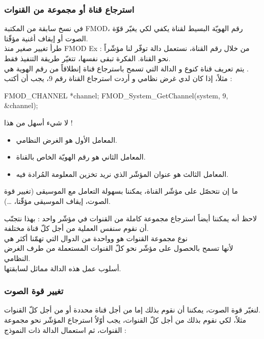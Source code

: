 \subsubsection{استرجاع قناة أو مجموعة من القنوات}

في نسخ سابقة من المكتبة
\textenglish{FMOD}،
رقم الهويّة البسيط لقناة يكفي لكي يغيّر قوّة الصوت أو إيقاف أغنية مؤقّتا.\\
طرأ تغيير صغير منذ
\textenglish{FMOD Ex} :
من خلال رقم القناة، نستعمل دالة توفّر لنا مؤشّراً نحو القناة. الفكرة تبقى نفسها، تتغيّر طريقة التنفيذ فقط.\\
يتم تعريف قناة كنوع
و الدالة التي تسمح باسترجاع قناة إنطلاقاً من رقم الهوية هي
.\\
مثلاً، إذا كان لدي غرض نظامي و أردت استرجاع القناة رقم 9، يجب أن أكتب :

\begin{Csource}
FMOD_CHANNEL *channel;
FMOD_System_GetChannel(system, 9, &channel);
\end{Csource}

لا شيء أسهل من هذا !

\begin{itemize}
	\item المعامل الأول هو الغرض النظامي.
	\item المعامل الثاني هو رقم الهويّة الخاص بالقناة.
	\item المعامل الثالث هو عنوان المؤشّر الذي نريد تخزين المعلومة المُرادة فيه.
\end{itemize}

ما إن نتحصّل على مؤشّر القناة، يمكننا بسهولة التعامل مع الموسيقى (تغيير قوة الصوت، إيقاف الموسيقى مؤقّتا، \dots).

لاحظ أنه يمكننا أيضاً استرجاع مجموعة كاملة من القنوات في مؤشّر واحد : بهذا نتجنّب أن نقوم سنفس العملية من أجل كلّ قناة مختلفة.\\
نوع مجموعة القنوات هو
وواحدة من الدوال التي تهمّنا أكثر هي\\
لأنها تسمح بالحصول على مؤشّر نحو كلّ القنوات المستعملة من طرف الغرض النظامي.\\
أسلوب عمل هذه الدالة مماثل لسابقتها.

\subsubsection{تغيير قوة الصوت}

لنغيّر قوة الصوت، يمكننا أن نقوم بذلك إما من أجل قناة محددة أو من أجل كلّ القنوات.\\
مثلاً، لكي نقوم بذلك من أجل كلّ القنوات، يجب أوّلاُ استرجاع المؤشّر نحو مجموعة القنوات، ثم استعمال الدالة
ذات النموذج :

